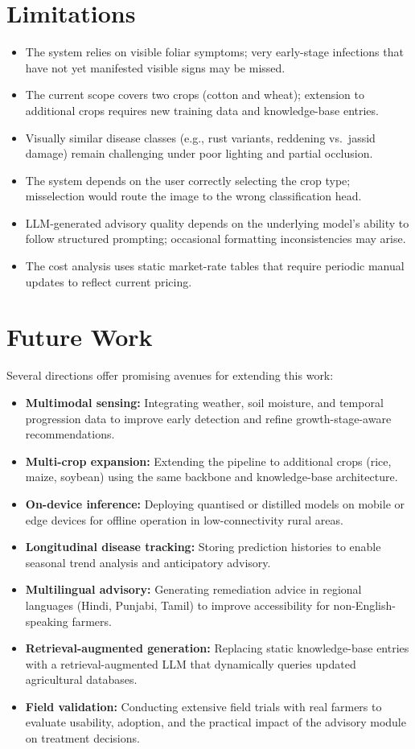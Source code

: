 \documentclass[12pt,a4paper]{report}
\begin{document}
\section{Limitations}
\begin{itemize}
    \item The system relies on visible foliar symptoms; very early-stage infections that have not yet manifested visible signs may be missed.
    \item The current scope covers two crops (cotton and wheat); extension to additional crops requires new training data and knowledge-base entries.
    \item Visually similar disease classes (e.g., rust variants, reddening vs.\ jassid damage) remain challenging under poor lighting and partial occlusion.
    \item The system depends on the user correctly selecting the crop type; misselection would route the image to the wrong classification head.
    \item LLM-generated advisory quality depends on the underlying model's ability to follow structured prompting; occasional formatting inconsistencies may arise.
    \item The cost analysis uses static market-rate tables that require periodic manual updates to reflect current pricing.
\end{itemize}

\section{Future Work}
\enlargethispage{\baselineskip}
Several directions offer promising avenues for extending this work:
\begin{itemize}
    \item \textbf{Multimodal sensing:} Integrating weather, soil moisture, and temporal progression data to improve early detection and refine growth-stage-aware recommendations.
    \item \textbf{Multi-crop expansion:} Extending the pipeline to additional crops (rice, maize, soybean) using the same backbone and knowledge-base architecture.
    \item \textbf{On-device inference:} Deploying quantised or distilled models on mobile or edge devices for offline operation in low-connectivity rural areas.
    \item \textbf{Longitudinal disease tracking:} Storing prediction histories to enable seasonal trend analysis and anticipatory advisory.
    \item \textbf{Multilingual advisory:} Generating remediation advice in regional languages (Hindi, Punjabi, Tamil) to improve accessibility for non-English-speaking farmers.
    \item \textbf{Retrieval-augmented generation:} Replacing static knowledge-base entries with a retrieval-augmented LLM that dynamically queries updated agricultural databases.
    \item \textbf{Field validation:} Conducting extensive field trials with real farmers to evaluate usability, adoption, and the practical impact of the advisory module on treatment decisions.
\end{itemize}
\end{document}
